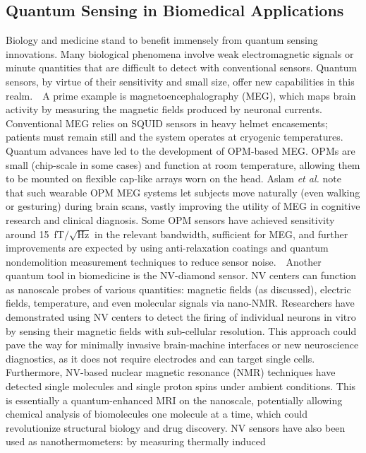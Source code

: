 \documentclass[12pt]{article}
\begin{document}
\subsection{Quantum Sensing in Biomedical Applications}

Biology and medicine stand to benefit immensely from quantum sensing
innovations. Many biological phenomena involve weak electromagnetic
signals or minute quantities that are difficult to detect with
conventional sensors. Quantum sensors, by virtue of their sensitivity
and small size, offer new capabilities in this realm\cite{Aslam2023}.
  A prime example is magnetoencephalography (MEG), which maps brain
activity by measuring the magnetic fields produced by neuronal
currents. Conventional MEG relies on SQUID sensors in heavy helmet
encasements; patients must remain still and the system operates at
cryogenic temperatures. Quantum advances have led to the development
of OPM-based MEG. OPMs are small (chip-scale in some cases) and
function at room temperature, allowing them to be mounted on flexible
cap-like arrays worn on the head. Aslam \textit{et al.} note that such
wearable OPM MEG systems let subjects move naturally (even walking or
gesturing) during brain scans, vastly improving the utility of MEG in
cognitive research and clinical diagnosis\cite{Aslam2023}. Some OPM
sensors have achieved sensitivity around 15~fT$/\sqrt{\text{Hz}}$ in
the relevant bandwidth, sufficient for MEG, and further improvements
are expected by using anti-relaxation coatings and quantum
nondemolition measurement techniques to reduce sensor noise.   
Another quantum tool in biomedicine is the NV-diamond sensor. NV
centers can function as nanoscale probes of various quantities:
magnetic fields (as discussed), electric fields, temperature, and even
molecular signals via nano-NMR. Researchers have demonstrated using NV
centers to detect the firing of individual neurons in vitro by sensing
their magnetic fields with sub-cellular
resolution\cite{Aslam2023}. This approach could pave the way for
minimally invasive brain-machine interfaces or new neuroscience
diagnostics, as it does not require electrodes and can target single
cells. Furthermore, NV-based nuclear magnetic resonance (NMR)
techniques have detected single molecules and single proton spins
under ambient conditions\cite{Aslam2023}. This is essentially a
quantum-enhanced MRI on the nanoscale, potentially allowing chemical
analysis of biomolecules one molecule at a time, which could
revolutionize structural biology and drug discovery. NV sensors have
also been used as nanothermometers: by measuring thermally induced
\end{document}
